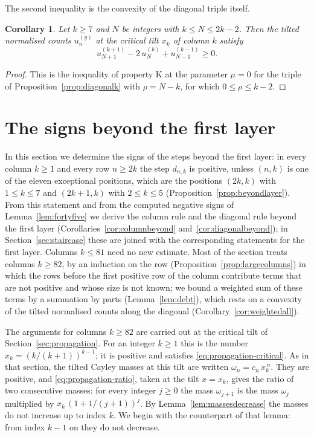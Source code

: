 \documentclass{amsart}
\makeatletter
\newtheorem{corollary}[theorem]{Corollary}
\theoremstyle{definition}
\theoremstyle{remark}
\numberwithin{equation}{section}
\def\subsection{\@startsection{subsection}{2}\z@{.5\linespacing\@plus.7\linespacing}{-.5em}{\normalfont\bfseries\boldmath}}
\makeatother
\begin{document}
The second inequality is the convexity of the diagonal triple itself.

\begin{corollary}\label{cor:convexlayer}
Let $k\ge7$ and $N$ be integers with $k\le N\le2k-2$. Then the tilted
normalised counts $u^{(y)}_n$ at the critical tilt $x_k$ of column $k$
satisfy
\[
u^{(k+1)}_{N+1}-2\,u^{(k)}_N+u^{(k-1)}_{N-1}\ge0 .
\]
\end{corollary}

\begin{proof}
This is the inequality of property K at the parameter $\mu=0$ for the triple
of Proposition~\ref{prop:diagonalk} with $\rho=N-k$, for which
$0\le\rho\le k-2$.
\end{proof}

\section{The signs beyond the first layer}\label{sec:beyond}
In this section we determine the signs of the steps beyond the first layer:
in every column $k\ge1$ and every row $n\ge2k$ the step $d_{n,k}$ is positive, unless
$(n,k)$ is one of the eleven exceptional positions, which are the positions
$(2k,k)$ with $1\le k\le7$ and $(2k+1,k)$ with $2\le k\le5$
(Proposition~\ref{prop:beyondlayer}). From this statement and from the
computed negative signs of Lemma~\ref{lem:fortyfive} we derive the column
rule and the diagonal rule beyond the first layer
(Corollaries~\ref{cor:columnbeyond} and~\ref{cor:diagonalbeyond}); in
Section~\ref{sec:staircase} these are joined with the corresponding
statements for the first layer. Columns
$k\le81$ need no new estimate. Most
of the section treats columns $k\ge82$, by an induction on the row
(Proposition~\ref{prop:largecolumns}) in which the rows before the first
positive row of the column contribute terms that are not positive and whose
size is not known; we bound a weighted sum of these terms by a summation by
parts (Lemma~\ref{lem:debt}), which rests on a convexity of the tilted
normalised counts along the diagonal (Corollary~\ref{cor:weightedall}).

\subsection{Convexity along the diagonal}\label{subsec:beyond-convexity}

The arguments for columns $k\ge82$ are carried out at the critical tilt
of Section~\ref{sec:propagation}. For an integer $k\ge1$ this is the number
$x_k=(k/(k+1))^{k-1}$; it is positive and satisfies
\eqref{eq:propagation-critical}. As in that section, the tilted Cayley
masses at this tilt are written $\omega_n=c_n\,x_k^{\,n}$.
They are positive, and \eqref{eq:propagation-ratio}, taken at the tilt
$x=x_k$, gives the ratio of two consecutive masses: for every integer
$j\ge0$ the mass $\omega_{j+1}$ is the mass $\omega_j$ multiplied by
$x_k\,(1+1/(j+1))^{j}$.
By Lemma~\ref{lem:massesdecrease} the masses do not increase up to index
$k$. We begin with the counterpart of that lemma: from index $k-1$ on
they do not decrease.
\end{document}
